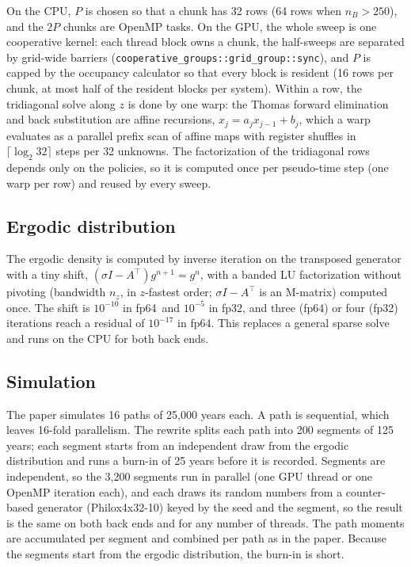 \documentclass[11pt]{article}
\newcommand{\fpd}{\textsf{fp64}}
\newcommand{\fps}{\textsf{fp32}}
\begin{document}
On the CPU, $P$ is chosen so that a chunk has 32 rows (64 rows when $n_B>250$), and the $2P$ chunks are OpenMP tasks. On the GPU, the whole sweep is one cooperative kernel: each thread block owns a chunk, the half-sweeps are separated by grid-wide barriers (\texttt{cooperative\_groups::grid\_group::sync}), and $P$ is capped by the occupancy calculator so that every block is resident (16 rows per chunk, at most half of the resident blocks per system). Within a row, the tridiagonal solve along $z$ is done by one warp: the Thomas forward elimination and back substitution are affine recursions, $x_j = a_j x_{j-1} + b_j$, which a warp evaluates as a parallel prefix scan of affine maps with register shuffles in $\lceil\log_2 32\rceil$ steps per 32 unknowns. The factorization of the tridiagonal rows depends only on the policies, so it is computed once per pseudo-time step (one warp per row) and reused by every sweep.

\subsection{Ergodic distribution}
The ergodic density is computed by inverse iteration on the transposed generator with a tiny shift, $(\sigma I - A^\top) g^{n+1} = g^n$, with a banded LU factorization without pivoting (bandwidth $n_z$, in $z$-fastest order; $\sigma I - A^\top$ is an M-matrix) computed once. The shift is $10^{-10}$ in \fpd\ and $10^{-5}$ in \fps, and three (\fpd) or four (\fps) iterations reach a residual of $10^{-17}$ in \fpd. This replaces a general sparse solve and runs on the CPU for both back ends.

\subsection{Simulation}
The paper simulates 16 paths of 25{,}000 years each. A path is sequential, which leaves 16-fold parallelism. The rewrite splits each path into 200 segments of 125 years; each segment starts from an independent draw from the ergodic distribution and runs a burn-in of 25 years before it is recorded. Segments are independent, so the 3{,}200 segments run in parallel (one GPU thread or one OpenMP iteration each), and each draws its random numbers from a counter-based generator (Philox4x32-10) keyed by the seed and the segment, so the result is the same on both back ends and for any number of threads. The path moments are accumulated per segment and combined per path as in the paper. Because the segments start from the ergodic distribution, the burn-in is short.
\end{document}
